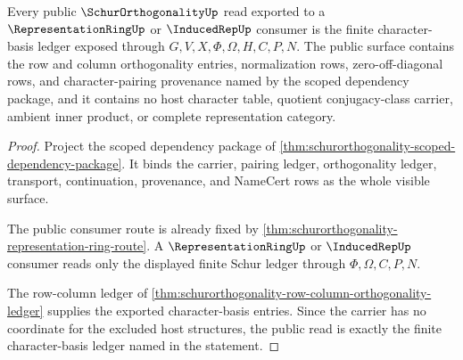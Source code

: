 \begin{theorem}
\label{thm:schurorthogonality-character-basis-public}
Every public $\SchurOrthogonalityUp$ read exported to a $\RepresentationRingUp$ or $\InducedRepUp$ consumer is the finite character-basis ledger exposed through $G,V,X,\Phi,\Omega,H,C,P,N$. The public surface contains the row and column orthogonality entries, normalization rows, zero-off-diagonal rows, and character-pairing provenance named by the scoped dependency package, and it contains no host character table, quotient conjugacy-class carrier, ambient inner product, or complete representation category.
\end{theorem}
\begin{proof}
Project the scoped dependency package of \autoref{thm:schurorthogonality-scoped-dependency-package}. It binds the carrier, pairing ledger, orthogonality ledger, transport, continuation, provenance, and NameCert rows as the whole visible surface.

The public consumer route is already fixed by \autoref{thm:schurorthogonality-representation-ring-route}. A $\RepresentationRingUp$ or $\InducedRepUp$ consumer reads only the displayed finite Schur ledger through $\Phi,\Omega,C,P,N$.

The row-column ledger of \autoref{thm:schurorthogonality-row-column-orthogonality-ledger} supplies the exported character-basis entries. Since the carrier has no coordinate for the excluded host structures, the public read is exactly the finite character-basis ledger named in the statement.
\end{proof}


\begin{closurestatus}{\SchurOrthogonalityUp}
  \theoryclosure{\matureClosure}
  \formalstatus{\unformalizedV}
\end{closurestatus}
